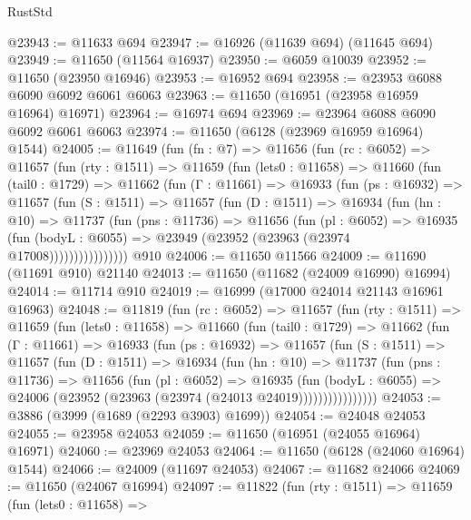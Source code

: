 \begin{lexlean}{RustStd}
\begin{coremodule}
@23943 := @11633 @694
@23947 := @16926 (@11639 @694) (@11645 @694)
@23949 := @11650 (@11564 @16937)
@23950 := @6059 @10039
@23952 := @11650 (@23950 @16946)
@23953 := @16952 @694
@23958 := @23953 @6088 @6090 @6092 @6061 @6063
@23963 := @11650 (@16951 (@23958 @16959 @16964) @16971)
@23964 := @16974 @694
@23969 := @23964 @6088 @6090 @6092 @6061 @6063
@23974 := @11650 (@6128 (@23969 @16959 @16964) @1544)
@24005 := @11649
    (fun (fn : @7) =>
    @11656
      (fun (rc : @6052) =>
      @11657
        (fun (rty : @1511) =>
        @11659
          (fun (lets0 : @11658) =>
          @11660
            (fun (tail0 : @1729) =>
            @11662
              (fun (Γ : @11661) =>
              @16933
                (fun (ps : @16932) =>
                @11657
                  (fun (S : @1511) =>
                  @11657
                    (fun (D : @1511) =>
                    @16934
                      (fun (hn : @10) =>
                      @11737
                        (fun (pns : @11736) =>
                        @11656
                          (fun (pl : @6052) =>
                          @16935
                            (fun (bodyL : @6055) =>
                            @23949 (@23952 (@23963 (@23974 @17008))))))))))))))))
    @910
@24006 := @11650 @11566
@24009 := @11690 (@11691 @910) @21140
@24013 := @11650 (@11682 (@24009 @16990) @16994)
@24014 := @11714 @910
@24019 := @16999 (@17000 @24014 @21143 @16961 @16963)
@24048 := @11819
    (fun (rc : @6052) =>
    @11657
      (fun (rty : @1511) =>
      @11659
        (fun (lets0 : @11658) =>
        @11660
          (fun (tail0 : @1729) =>
          @11662
            (fun (Γ : @11661) =>
            @16933
              (fun (ps : @16932) =>
              @11657
                (fun (S : @1511) =>
                @11657
                  (fun (D : @1511) =>
                  @16934
                    (fun (hn : @10) =>
                    @11737
                      (fun (pns : @11736) =>
                      @11656
                        (fun (pl : @6052) =>
                        @16935
                          (fun (bodyL : @6055) =>
                          @24006 (@23952 (@23963 (@23974 (@24013 @24019))))))))))))))))
@24053 := @3886 (@3999 (@1689 (@2293 @3903) @1699))
@24054 := @24048 @24053
@24055 := @23958 @24053
@24059 := @11650 (@16951 (@24055 @16964) @16971)
@24060 := @23969 @24053
@24064 := @11650 (@6128 (@24060 @16964) @1544)
@24066 := @24009 (@11697 @24053)
@24067 := @11682 @24066
@24069 := @11650 (@24067 @16994)
@24097 := @11822
    (fun (rty : @1511) =>
    @11659
      (fun (lets0 : @11658) =>

\end{coremodule}
\end{lexlean}
